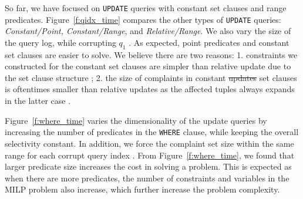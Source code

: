 So far, we have focused on \texttt{UPDATE} queries with constant set clauses and range predicates.  Figure~\ref{f:qidx_time} compares the other types of \texttt{UPDATE} queries: 
{\it Constant/Point, Constant/Range}, and {\it Relative/Range}. We also vary the size of the query log, while corrupting $q_1$ .
As expected, point predicates and constant set clauses are easier to solve.  We believe there are two reasons:
1. constraints we constructed for the constant set clauses are simpler than relative update due to the set clause structure ; 
2. the size of complaints  in constant \sout{updates} set clauses is oftentimes smaller than relative updates as the affected tuples always expands in the latter case . 

Figure~\ref{f:where_time} varies the dimensionality of the update queries by increasing the number of predicates in the \texttt{WHERE} clause, while keeping the overall selectivity constant. 
In addition, we force the complaint set size within the same range for each corrupt query index . 
From Figure~\ref{f:where_time}, we found that larger predicate size increases the cost in solving a problem. 
This is expected as when there are more predicates, the number of constraints and variables in the MILP problem also increase, which further increase the problem complexity.


